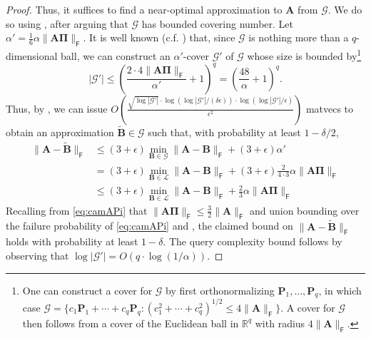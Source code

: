 \documentclass{article}[11pt]
\theoremstyle{definition}
\newcommand{\bv}[1]{\boldsymbol{\mathbf{#1}}}
\newcommand{\Fro}{\mathsf{F}}
\begin{document}
\begin{proof}
        Thus, it suffices to find a near-optimal approximation to $\bv A$ from $\mathcal G$. We do so using , after arguing that $\mathcal G$ has bounded covering number. Let $\alpha' = \frac16\alpha\|\bv{A\Pi}\|_\Fro$. It is well known (c.f. \cite[Corollary 4.2.13]{Vershynin2018}) that, since $\mathcal G$ is nothing more than a $q$-dimensional ball, we can construct an $\alpha'$-cover $\mathcal G'$ of $\mathcal G$ whose size is bounded by\footnote{One can construct a cover for $\mathcal{G}$ by first orthonormalizing $\bv{P}_1,\ldots,\bv{P}_q$, in which case $\mathcal{G}=\{c_1\bv{P}_1 + \cdots + c_q \bv{P}_q: \left(c_1^2 + \cdots + c_q^2\right)^{1/2} \leq 4\|\bv{A}\|_\Fro\}$. A cover for $\mathcal{G}$ then follows from a cover of the Euclidean ball in $\mathbb{R}^q$ with radius $4\|\bv{A}\|_{\Fro}$.}
        \begin{equation}\label{eq:covernumber}
            |\mathcal G'| \leq \left(\frac{2 \cdot 4\|\bv{A\Pi}\|_\Fro}{\alpha'} + 1\right)^q = \left(\frac{48}{\alpha} + 1\right)^q.
        \end{equation}
        Thus, by , we can issue $O\left(\frac{\sqrt{\log |\mathcal G'|} \cdot \log(\log |\mathcal G'|/(\delta \epsilon)) \cdot \log(\log |\mathcal G'|/\epsilon)}{\epsilon^2}\right)$ matvecs to obtain an approximation $\bv{\tilde B} \in \mathcal G$ such that, with probability at least $1-\delta/2$,
        \begin{align*}
            \|\bv A - \bv{\tilde B}\|_\Fro
            &\leq (3+\epsilon)\min_{\bv{B}\in \mathcal{G}}\|\bv{A}-\bv{B}\|_\Fro + (3 + \epsilon) \alpha'\\
            &= (3+\epsilon)\min_{\bv{B}\in \mathcal{L}}\|\bv{A} - \bv{B}\|_\Fro + (3 + \epsilon) \frac2{4 \cdot 3} \alpha \|\bv{A\Pi}\|_\Fro\\
            &\leq (3+\epsilon)\min_{\bv{B}\in \mathcal{L}}\|\bv{A} - \bv{B}\|_\Fro + \frac23 \alpha \|\bv{A\Pi}\|_\Fro
        \end{align*}
        Recalling from \eqref{eq:camAPi} that $\|\bv{A\Pi}\|_\Fro \leq \frac32 \|\bv{A}\|_\Fro$ and union bounding over the failure probability of \eqref{eq:camAPi} and , the claimed bound on $\|\bv{A} - \bv{\tilde B}\|_\Fro$ holds with probability at least $1 - \delta$. The query complexity bound follows by observing that $\log|\mathcal G'| = O(q \cdot \log(1/\alpha))$.
    \end{proof}
\end{document}
